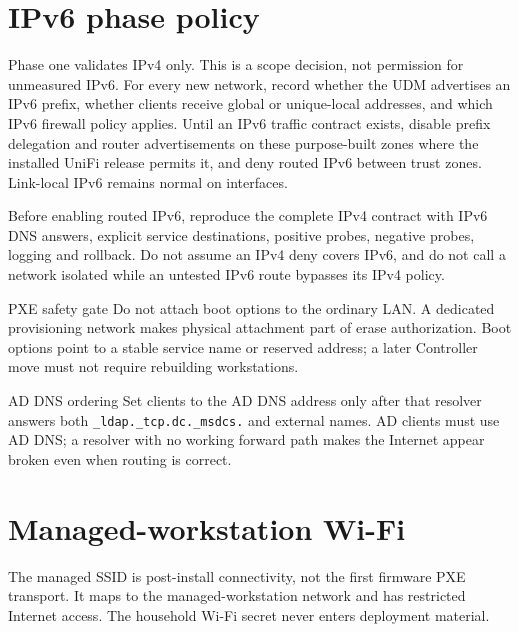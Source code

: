 \section{IPv6 phase policy}
Phase one validates IPv4 only.  This is a scope decision, not permission for
unmeasured IPv6.  For every new network, record whether the UDM advertises an
IPv6 prefix, whether clients receive global or unique-local addresses, and
which IPv6 firewall policy applies.  Until an IPv6 traffic contract exists,
disable prefix delegation and router advertisements on these purpose-built
zones where the installed UniFi release permits it, and deny routed IPv6
between trust zones.  Link-local IPv6 remains normal on interfaces.

Before enabling routed IPv6, reproduce the complete IPv4 contract with IPv6
DNS answers, explicit service destinations, positive probes, negative probes,
logging and rollback.  Do not assume an IPv4 deny covers IPv6, and do not call
a network isolated while an untested IPv6 route bypasses its IPv4 policy.

\begin{telospanel}{PXE safety gate}
Do not attach boot options to the ordinary LAN.  A dedicated provisioning
network makes physical attachment part of erase authorization.  Boot options
point to a stable service name or reserved address; a later Controller move
must not require rebuilding workstations.
\end{telospanel}

\begin{telospanel}{AD DNS ordering}
Set clients to the AD DNS address only after that resolver answers both
\texttt{\_ldap.\_tcp.dc.\_msdcs.} and external names. AD clients
must use AD DNS; a resolver with no working forward path makes the Internet
appear broken even when routing is correct.
\end{telospanel}

\section{Managed-workstation Wi-Fi}
The managed SSID is post-install connectivity, not the first firmware PXE
transport.  It maps to the managed-workstation network and has restricted
Internet access.  The household Wi-Fi secret never enters deployment material.

